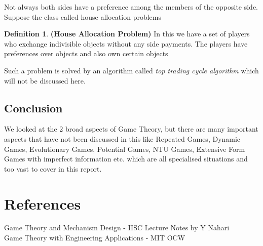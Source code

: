 \documentclass{article}
\theoremstyle{definition}
\newtheorem{defn}{Definition}[section]
\begin{document}
Not always both sides have a preference among the members of the opposite side. Suppose the class called house allocation problems
\begin{defn}
\textbf{(House Allocation Problem)} In this we have a set of players who exchange indivisible objects without any side payments. The players have preferences over objects and also own certain objects
\end{defn}
Such a problem is solved by an algorithm called \textit{top trading cycle algorithm} which will not be discussed here.

\subsection*{Conclusion}
We looked at the 2 broad aspects of Game Theory, but there are many important aspects that have not been discussed in this like Repeated Games, Dynamic Games, Evolutionary Games, Potential Games, NTU Games, Extensive Form Games with imperfect information etc. which are all specialised situations and too vast to cover in this report.

\section*{References}
Game Theory and Mechanism Design - IISC Lecture Notes by Y Nahari\\
Game Theory with Engineering Applications - MIT OCW\\
\end{document}
